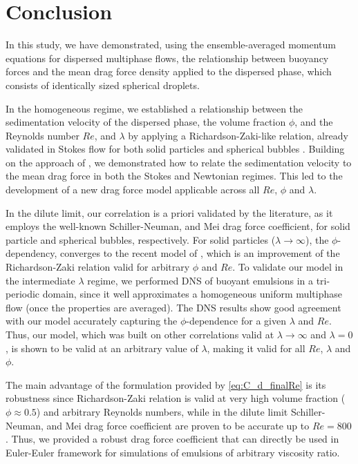 \section{Conclusion}

In this study, we have demonstrated, using the ensemble-averaged momentum equations for dispersed multiphase flows, the relationship between buoyancy forces and the mean drag force density applied to the dispersed phase, which consists of identically sized spherical droplets. 

In the homogeneous regime, we established a relationship between the sedimentation velocity of the dispersed phase, the volume fraction $\phi$, and the Reynolds number $Re$, and $\lambda$ by applying a Richardson-Zaki-like relation, already validated in Stokes flow for both solid particles and spherical bubbles .
Building on the approach of \citet{jackson2000}, we demonstrated how to relate the sedimentation velocity to the mean drag force in both the Stokes and Newtonian regimes. 
This led to the development of a new drag force model applicable across all $Re$, $\phi$ and $\lambda$. 

In the dilute limit, our correlation is a priori validated by the literature, as it employs the well-known Schiller-Neuman, and Mei drag force coefficient, for solid particle and spherical bubbles, respectively. 
For solid particles ($\lambda \to \infty$), the $\phi$-dependency, converges to the recent model of \citet{kramer2019improvement}, which is an improvement of the Richardson-Zaki relation valid for arbitrary $\phi$ and $Re$.
To validate our model in the intermediate $\lambda$ regime, we performed DNS of buoyant emulsions in a tri-periodic domain, since it well approximates a homogeneous uniform multiphase flow (once the properties are averaged).
The DNS results show good agreement with our model accurately capturing the $\phi$-dependence for a given $\lambda$ and $Re$.
Thus, our model, which was built on other correlations valid at $\lambda\to\infty$ and $\lambda = 0$, is shown to be valid at an arbitrary value of $\lambda$, making it valid for all $Re$, $\lambda$ and $\phi$.  

The main advantage of the formulation provided by \ref{eq:C_d_finalRe} is its robustness since Richardson-Zaki relation is valid at very high volume fraction  ($\phi \approx 0.5$) and arbitrary Reynolds numbers, while in the dilute limit Schiller-Neuman, and Mei drag force coefficient are proven to be accurate up to $Re = 800$. 
Thus, we provided a robust drag force coefficient that can directly be used in Euler-Euler framework for simulations of emulsions of arbitrary viscosity ratio. 